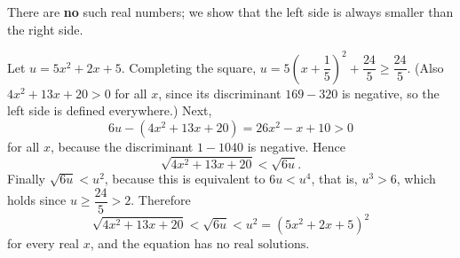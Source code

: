 There are \textbf{no} such real numbers; we show that the left side is always smaller than the right side.

Let $u=5x^2+2x+5$. Completing the square, $u=5\left(x+\dfrac{1}{5}\right)^2+\dfrac{24}{5}\ge\dfrac{24}{5}$. (Also $4x^2+13x+20>0$ for all $x$, since its discriminant $169-320$ is negative, so the left side is defined everywhere.) Next,
\[6u-\left(4x^2+13x+20\right)=26x^2-x+10>0\]
for all $x$, because the discriminant $1-1040$ is negative. Hence
\[\sqrt{4x^2+13x+20}<\sqrt{6u}.\]
Finally $\sqrt{6u}<u^2$, because this is equivalent to $6u<u^4$, that is, $u^3>6$, which holds since $u\ge\dfrac{24}{5}>2$. Therefore
\[\sqrt{4x^2+13x+20}<\sqrt{6u}<u^2=\left(5x^2+2x+5\right)^2\]
for every real $x$, and the equation has $\boxed{\text{no real solutions}}$.
